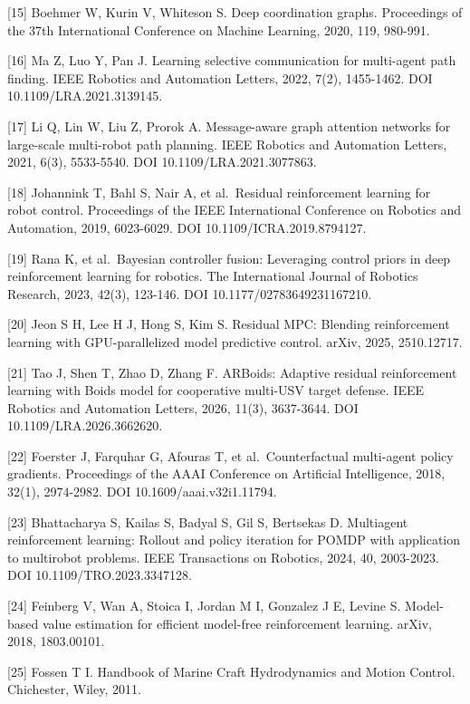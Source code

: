 \documentclass[UTF8,a4paper,zihao=5,fontset=none]{ctexart}
\begin{document}
{[}15{]} Boehmer W, Kurin V, Whiteson S. Deep coordination graphs. Proceedings of the 37th International Conference on Machine Learning, 2020, 119, 980-991.

{[}16{]} Ma Z, Luo Y, Pan J. Learning selective communication for multi-agent path finding. IEEE Robotics and Automation Letters, 2022, 7(2), 1455-1462. DOI 10.1109/LRA.2021.3139145.

{[}17{]} Li Q, Lin W, Liu Z, Prorok A. Message-aware graph attention networks for large-scale multi-robot path planning. IEEE Robotics and Automation Letters, 2021, 6(3), 5533-5540. DOI 10.1109/LRA.2021.3077863.

{[}18{]} Johannink T, Bahl S, Nair A, et al.~Residual reinforcement learning for robot control. Proceedings of the IEEE International Conference on Robotics and Automation, 2019, 6023-6029. DOI 10.1109/ICRA.2019.8794127.

{[}19{]} Rana K, et al.~Bayesian controller fusion: Leveraging control priors in deep reinforcement learning for robotics. The International Journal of Robotics Research, 2023, 42(3), 123-146. DOI 10.1177/02783649231167210.

{[}20{]} Jeon S H, Lee H J, Hong S, Kim S. Residual MPC: Blending reinforcement learning with GPU-parallelized model predictive control. arXiv, 2025, 2510.12717.

{[}21{]} Tao J, Shen T, Zhao D, Zhang F. ARBoids: Adaptive residual reinforcement learning with Boids model for cooperative multi-USV target defense. IEEE Robotics and Automation Letters, 2026, 11(3), 3637-3644. DOI 10.1109/LRA.2026.3662620.

{[}22{]} Foerster J, Farquhar G, Afouras T, et al.~Counterfactual multi-agent policy gradients. Proceedings of the AAAI Conference on Artificial Intelligence, 2018, 32(1), 2974-2982. DOI 10.1609/aaai.v32i1.11794.

{[}23{]} Bhattacharya S, Kailas S, Badyal S, Gil S, Bertsekas D. Multiagent reinforcement learning: Rollout and policy iteration for POMDP with application to multirobot problems. IEEE Transactions on Robotics, 2024, 40, 2003-2023. DOI 10.1109/TRO.2023.3347128.

{[}24{]} Feinberg V, Wan A, Stoica I, Jordan M I, Gonzalez J E, Levine S. Model-based value estimation for efficient model-free reinforcement learning. arXiv, 2018, 1803.00101.

{[}25{]} Fossen T I. Handbook of Marine Craft Hydrodynamics and Motion Control. Chichester, Wiley, 2011.
\end{document}
